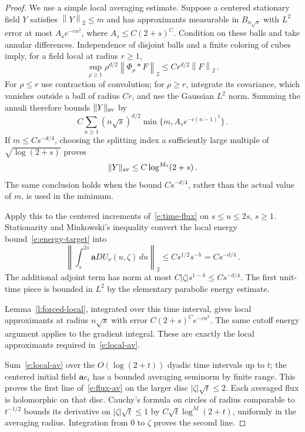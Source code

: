 \documentclass[11pt]{amsart}
\theoremstyle{definition}
\theoremstyle{remark}
\numberwithin{equation}{section}
\renewcommand{\a}{\mathbf a}
\newcommand{\dd}{\,d}
\newcommand{\norm}[1]{\left\|#1\right\|}
\begin{document}
\begin{proof}
We use a simple local averaging estimate. Suppose a centered stationary field $Y$ satisfies $\norm Y_2\leq m$ and has approximants measurable in $B_{n\sqrt s}$ with $L^2$ error at most $A_s e^{-cn^2}$, where $A_s\leq C(2+s)^C$. Condition on these balls and take annular differences. Independence of disjoint balls and a finite coloring of cubes imply, for a field local at radius $r\geq1$,
\begin{equation*}
 \sup_{\rho\geq1}\rho^{d/2}\norm{\Phi_\rho*F}_2
 \leq Cr^{d/2}\norm F_2\, .
\end{equation*}
For $\rho\leq r$ use contraction of convolution; for $\rho\geq r$, integrate its covariance, which vanishes outside a ball of radius $Cr$, and use the Gaussian $L^2$ norm. Summing the annuli therefore bounds $\|Y\|_{\rm av}$ by
\begin{equation*}
 C\sum_{n\geq1}(n\sqrt s)^{d/2}
                   \min\{m,A_s e^{-c(n-1)^2}\}\, .
\end{equation*}
If $m\leq Cs^{-d/4}$, choosing the splitting index a sufficiently large multiple of $\sqrt{\log(2+s)}$ proves
\begin{equation}\label{e:local-av}
 \|Y\|_{\rm av}\leq C\log^{M_0}(2+s)\, .
\end{equation}
The same conclusion holds when the bound $Cs^{-d/4}$, rather than the actual value of $m$, is used in the minimum.

Apply this to the centered increments of~\eqref{e:time-flux} on $s\leq u\leq2s$, $s\geq1$. Stationarity and Minkowski's inequality convert the local energy bound~\eqref{e:energy-target} into
\begin{equation*}
 \norm{\int_s^{2s}\a D U_\nu(u,\zeta)\dd u}_2
 \leq Cs^{1/2}s^{-h}=Cs^{-d/4}\, .
\end{equation*}
The additional adjoint term has norm at most $C|\zeta|s^{1-h}\leq Cs^{-d/4}$. The first unit-time piece is bounded in $L^2$ by the elementary parabolic energy estimate.

Lemma~\ref{l:forced-local}, integrated over this time interval, gives local approximants at radius $n\sqrt s$ with error $C(2+s)^C e^{-cn^2}$. The same cutoff energy argument applies to the gradient integral. These are exactly the local approximants required in~\eqref{e:local-av}.

Sum~\eqref{e:local-av} over the $O(\log(2+t))$ dyadic time intervals up to $t$; the centered initial field $\a e_i$ has a bounded averaging seminorm by finite range. This proves the first line of~\eqref{e:flux-av} on the larger disc $|\zeta|\sqrt t\leq2$. Each averaged flux is holomorphic on that disc. Cauchy's formula on circles of radius comparable to $t^{-1/2}$ bounds its derivative on $|\zeta|\sqrt t\leq1$ by $C\sqrt t\log^M(2+t)$, uniformly in the averaging radius. Integration from $0$ to $\zeta$ proves the second line.
\end{proof}
\end{document}
